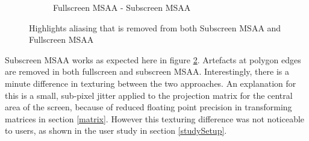 \documentclass[12pt,a4paper,twoside,openright]{report}
\begin{document}
\begin{figure}[tbh]
\begin{subfigure}{0.5\textwidth}
\caption{Fullscreen MSAA - Subscreen MSAA}
\label{fig:subim1}
\end{subfigure}
 
\caption{Highlights aliasing that is removed from both Subscreen MSAA and Fullscreen MSAA}
\label{fig:multisample}
\end{figure}

\noindent Subscreen MSAA works as expected here in figure \ref{fig:multisample}. Artefacts at polygon edges are removed in both fullscreen and subscreen MSAA. Interestingly, there is a minute difference in texturing between the two approaches. An explanation for this is a small, sub-pixel jitter applied to the projection matrix for the central area of the screen, because of reduced floating point precision in transforming matrices in section \ref{matrix}. However this texturing difference was not noticeable to users, as shown in the user study in section \ref{studySetup}.

\clearpage
\end{document}
